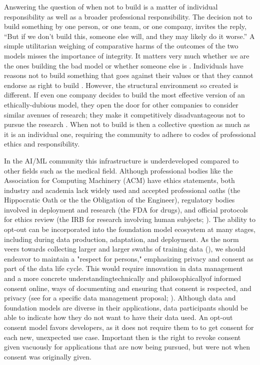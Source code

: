 Answering the question of when not to build is a matter of individual responsibility as well as a broader professional responsibility. 
The decision not to build something by one person, or one team, or one company, invites the reply, “But if we don’t build this, someone else will, and they may likely do it worse.”  
A simple utilitarian weighing of comparative harms of the outcomes of the two models misses the importance of integrity. 
It matters very much whether \textit{we} are the ones building the bad model or whether someone else is \citep{Williams1973}.
Individuals have reasons not to build something that goes against their values or that they cannot endorse as right to build \citep{Korsgaard2009}. However, the structural environment so created is different. If even one company decides to build the most effective version of an ethically-dubious model, they open the door for other companies to consider similar avenues of research; they make it competitively disadvantageous not to pursue the research \citep{askell_role_2019}. 
When not to build is then a collective question as much as it is an individual one, requiring the community to adhere to codes of professional ethics and responsibility. 

In the AI/ML community this infrastructure is underdeveloped compared to other fields such as the medical field. Although professional bodies like the Association for Computing Machinery (ACM) have ethics statements, both industry and academia lack widely used and accepted professional oaths (\eg the Hippocratic Oath or the the Obligation of the Engineer), regulatory bodies involved in deployment and research (\eg the FDA for drugs), and official protocols for ethics review (\eg the IRB for research involving human subjects; \citep{bernstein_esr_2021}). 
The ability to opt-out can be incorporated into the foundation model ecosystem at many stages, including during data production, adaptation, and deployment. As the norm veers towards collecting larger and larger swaths of training data (), we should endeavor to maintain a "respect for persons," \citep{belmont_report} emphasizing privacy and consent as part of the data life cycle. 
This would require innovation in data management and a more concrete understanding\dash{}technically and philosophically\dash{}of informed consent online, ways of documenting and ensuring that consent is respected, and privacy (see  for a specific data management proposal; \citep{changingtherules_ohm}). 
Although data and foundation models are diverse in their applications, data participants should be able to indicate how they do not want to have their data used. An opt-out consent model favors developers, as it does not require them to to get consent for each new, unexpected use case. Important then is the right to revoke consent given vacuously for applications that are now being pursued, but were not when consent was originally given. 

